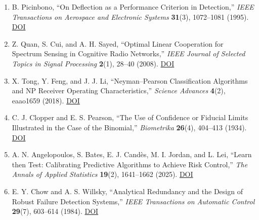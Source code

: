 \documentclass[10pt,a4paper]{article}
\begin{document}
\begin{enumerate}
\item B. Picinbono, “On Deflection as a Performance Criterion in Detection,” \emph{IEEE Transactions on Aerospace and Electronic Systems} \textbf{31}(3), 1072–1081 (1995). \href{https://doi.org/10.1109/7.395235}{DOI}
\item Z. Quan, S. Cui, and A. H. Sayed, “Optimal Linear Cooperation for Spectrum Sensing in Cognitive Radio Networks,” \emph{IEEE Journal of Selected Topics in Signal Processing} \textbf{2}(1), 28–40 (2008). \href{https://doi.org/10.1109/JSTSP.2007.914882}{DOI}
\item X. Tong, Y. Feng, and J. J. Li, “Neyman–Pearson Classification Algorithms and NP Receiver Operating Characteristics,” \emph{Science Advances} \textbf{4}(2), eaao1659 (2018). \href{https://doi.org/10.1126/sciadv.aao1659}{DOI}
\item C. J. Clopper and E. S. Pearson, “The Use of Confidence or Fiducial Limits Illustrated in the Case of the Binomial,” \emph{Biometrika} \textbf{26}(4), 404–413 (1934). \href{https://doi.org/10.1093/biomet/26.4.404}{DOI}
\item A. N. Angelopoulos, S. Bates, E. J. Candès, M. I. Jordan, and L. Lei, “Learn then Test: Calibrating Predictive Algorithms to Achieve Risk Control,” \emph{The Annals of Applied Statistics} \textbf{19}(2), 1641–1662 (2025). \href{https://doi.org/10.1214/24-AOAS1998}{DOI}
\item E. Y. Chow and A. S. Willsky, “Analytical Redundancy and the Design of Robust Failure Detection Systems,” \emph{IEEE Transactions on Automatic Control} \textbf{29}(7), 603–614 (1984). \href{https://doi.org/10.1109/TAC.1984.1103593}{DOI}
\end{enumerate}
\end{document}
